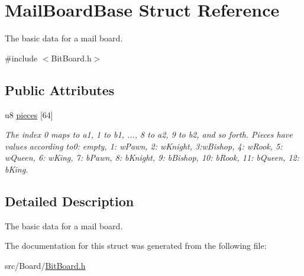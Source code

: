 \hypertarget{structMailBoardBase}{}\section{Mail\+Board\+Base Struct Reference}
\label{structMailBoardBase}


The basic data for a mail board.  




{\ttfamily \#include $<$Bit\+Board.\+h$>$}

\subsection*{Public Attributes}
\begin{DoxyCompactItemize}
\item 
\mbox{\label{structMailBoardBase_a8550341788384804a05e9e8b01f6c1d6}} 
u8 \hyperlink{structMailBoardBase_a8550341788384804a05e9e8b01f6c1d6}{pieces} \mbox{[}64\mbox{]}
\begin{DoxyCompactList}\small\item\em The index 0 maps to a1, 1 to b1, ..., 8 to a2, 9 to b2, and so forth. Pieces have values according to0\+: empty, 1\+: w\+Pawn, 2\+: w\+Knight, 3\+:w\+Bishop, 4\+: w\+Rook, 5\+: w\+Queen, 6\+: w\+King, 7\+: b\+Pawn, 8\+: b\+Knight, 9\+: b\+Bishop, 10\+: b\+Rook, 11\+: b\+Queen, 12\+: b\+King. \end{DoxyCompactList}\end{DoxyCompactItemize}


\subsection{Detailed Description}
The basic data for a mail board. 

The documentation for this struct was generated from the following file\+:\begin{DoxyCompactItemize}
\item 
src/\+Board/\hyperlink{BitBoard_8h}{Bit\+Board.\+h}\end{DoxyCompactItemize}
